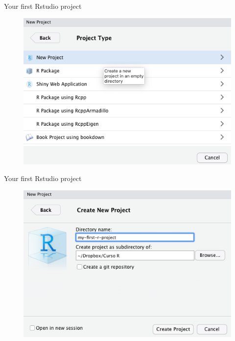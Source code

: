 \documentclass[ignorenonframetext,]{beamer}
\begin{document}
\begin{frame}{Your first Rstudio project}
\protect\hypertarget{your-first-rstudio-project-2}{}

\begin{figure}
\includegraphics[scale=0.43]{figures/new-project-3.png}
\end{figure}

\end{frame}

\begin{frame}{Your first Rstudio project}
\protect\hypertarget{your-first-rstudio-project-3}{}

\begin{figure}
\includegraphics[scale=0.43]{figures/new-project-4.png}
\end{figure}

\end{frame}
\end{document}
